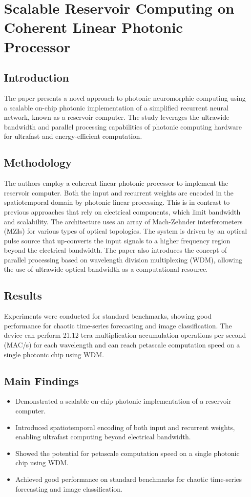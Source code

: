 \documentclass{article}
\begin{document}
\newpage
\section{Scalable Reservoir Computing on Coherent Linear Photonic Processor}

\subsection{Introduction}
The paper presents a novel approach to photonic neuromorphic computing using a scalable on-chip photonic implementation of a simplified recurrent neural network, known as a reservoir computer. The study leverages the ultrawide bandwidth and parallel processing capabilities of photonic computing hardware for ultrafast and energy-efficient computation.

\subsection{Methodology}
The authors employ a coherent linear photonic processor to implement the reservoir computer. Both the input and recurrent weights are encoded in the spatiotemporal domain by photonic linear processing. This is in contrast to previous approaches that rely on electrical components, which limit bandwidth and scalability. The architecture uses an array of Mach-Zehnder interferometers (MZIs) for various types of optical topologies. The system is driven by an optical pulse source that up-converts the input signals to a higher frequency region beyond the electrical bandwidth. The paper also introduces the concept of parallel processing based on wavelength division multiplexing (WDM), allowing the use of ultrawide optical bandwidth as a computational resource.

\subsection{Results}
Experiments were conducted for standard benchmarks, showing good performance for chaotic time-series forecasting and image classification. The device can perform 21.12 tera multiplication-accumulation operations per second (MAC/s) for each wavelength and can reach petascale computation speed on a single photonic chip using WDM.

\subsection{Main Findings}
\begin{itemize}
    \item Demonstrated a scalable on-chip photonic implementation of a reservoir computer.
    \item Introduced spatiotemporal encoding of both input and recurrent weights, enabling ultrafast computing beyond electrical bandwidth.
    \item Showed the potential for petascale computation speed on a single photonic chip using WDM.
    \item Achieved good performance on standard benchmarks for chaotic time-series forecasting and image classification.
\end{itemize}
\end{document}
